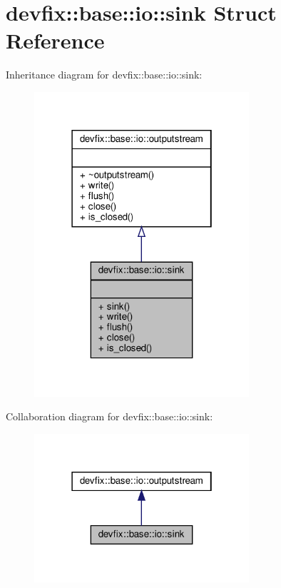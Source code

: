 \hypertarget{structdevfix_1_1base_1_1io_1_1sink}{}\section{devfix\+:\+:base\+:\+:io\+:\+:sink Struct Reference}
\label{structdevfix_1_1base_1_1io_1_1sink}


Inheritance diagram for devfix\+:\+:base\+:\+:io\+:\+:sink\+:\nopagebreak
\begin{figure}[H]
\begin{center}
\leavevmode
\includegraphics[width=226pt]{structdevfix_1_1base_1_1io_1_1sink__inherit__graph}
\end{center}
\end{figure}


Collaboration diagram for devfix\+:\+:base\+:\+:io\+:\+:sink\+:
\nopagebreak
\begin{figure}[H]
\begin{center}
\leavevmode
\includegraphics[width=226pt]{structdevfix_1_1base_1_1io_1_1sink__coll__graph}
\end{center}
\end{figure}
